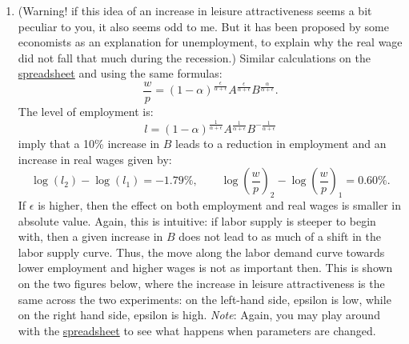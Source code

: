 \documentclass[]{book}
\providecommand{\tightlist}{%
  \setlength{\itemsep}{0pt}\setlength{\parskip}{0pt}}
\theoremstyle{definition}
\theoremstyle{definition}
\theoremstyle{definition}
\theoremstyle{remark}
\begin{document}
\begin{enumerate}
\def\labelenumi{\arabic{enumi}.}
\setcounter{enumi}{7}
\tightlist
\item
  (Warning! if this idea of an increase in leisure attractiveness seems
  a bit peculiar to you, it also seems odd to me. But it has been
  proposed by some economists as an explanation for unemployment, to
  explain why the real wage did not fall that much during the
  recession.) Similar calculations on the
  \href{https://docs.google.com/spreadsheets/d/1h9JJD8K2_IE166gdj78waf0zu4YDY9Rp3r5oiJR_06s/edit?usp=sharing}{spreadsheet}
  and using the same formulas:
  \[\frac{w}{p} = (1-\alpha)^{\frac{\epsilon}{\alpha+\epsilon}}A^{\frac{\epsilon}{\alpha+\epsilon}} B^{\frac{\alpha}{\alpha+\epsilon}}.\]
  The level of employment is:
  \[l= (1-\alpha)^{\frac{1}{\alpha+\epsilon}}A^{\frac{1}{\alpha+\epsilon}} B^{-\frac{1}{\alpha+\epsilon}}\]
  imply that a 10\% increase in \(B\) leads to a reduction in employment
  and an increase in real wages given by:
  \[\log(l_2)-\log(l_1)=-1.79\%, \qquad \log\left(\frac{w}{p}\right)_2-\log\left(\frac{w}{p}\right)_1=0.60\%.\]
  If \(\epsilon\) is higher, then the effect on both employment and real
  wages is smaller in absolute value. Again, this is intuitive: if labor
  supply is steeper to begin with, then a given increase in \(B\) does
  not lead to as much of a shift in the labor supply curve. Thus, the
  move along the labor demand curve towards lower employment and higher
  wages is not as important then. This is shown on the two figures
  below, where the increase in leisure attractiveness is the same across
  the two experiments: on the left-hand side, epsilon is low, while on
  the right hand side, epsilon is high. \emph{Note}: Again, you may play
  around with the
  \href{https://docs.google.com/spreadsheets/d/1h9JJD8K2_IE166gdj78waf0zu4YDY9Rp3r5oiJR_06s/edit?usp=sharing}{spreadsheet}
  to see what happens when parameters are changed.
\end{enumerate}
\end{document}
